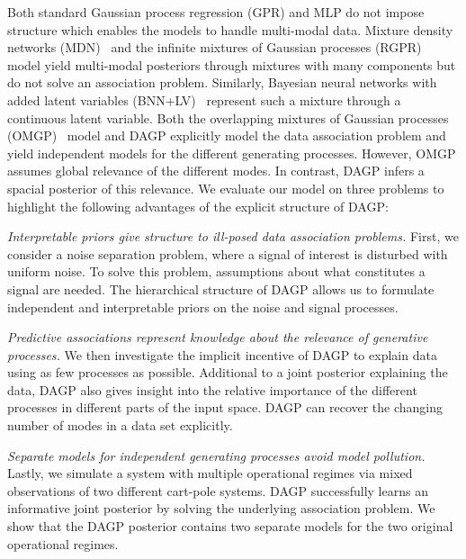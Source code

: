 Both standard Gaussian process regression (GPR) and MLP do not impose structure which enables the models to handle multi-modal data.
Mixture density networks (MDN)~\parencite{bishop_mixture_1994} and the infinite mixtures of Gaussian processes (RGPR)~\parencite{rasmussen_infinite_2002} model yield multi-modal posteriors through mixtures with many components but do not solve an association problem.
Similarly, Bayesian neural networks with added latent variables (BNN+LV)~\parencite{depeweg_learning_2016} represent such a mixture through a continuous latent variable.
Both the overlapping mixtures of Gaussian processes (OMGP)~\parencite{lazaro-gredilla_overlapping_2012} model and DAGP explicitly model the data association problem and yield independent models for the different generating processes.
However, OMGP assumes global relevance of the different modes.
In contrast, DAGP infers a spacial posterior of this relevance.
We evaluate our model on three problems to highlight the following advantages of the explicit structure of DAGP:

\emph{Interpretable priors give structure to ill-posed data association problems.}
First, we consider a noise separation problem, where a signal of interest is disturbed with uniform noise.
To solve this problem, assumptions about what constitutes a signal are needed.
The hierarchical structure of DAGP allows us to formulate independent and interpretable priors on the noise and signal processes.

\emph{Predictive associations represent knowledge about the relevance of generative processes.}
We then investigate the implicit incentive of DAGP to explain data using as few processes as possible.
Additional to a joint posterior explaining the data, DAGP also gives insight into the relative importance of the different processes in different parts of the input space.
DAGP can recover the changing number of modes in a data set explicitly.

\emph{Separate models for independent generating processes avoid model pollution.}
Lastly, we simulate a system with multiple operational regimes via mixed observations of two different cart-pole systems.
DAGP successfully learns an informative joint posterior by solving the underlying association problem.
We show that the DAGP posterior contains two separate models for the two original operational regimes.


